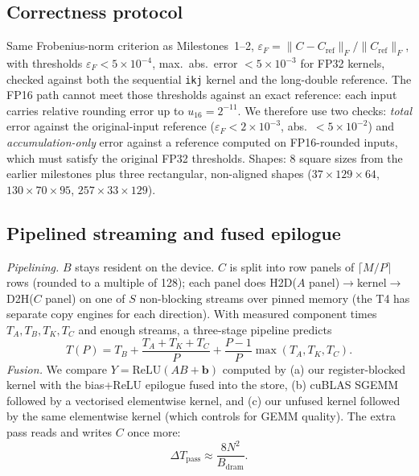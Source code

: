 \documentclass[conference]{IEEEtran}
\begin{document}
\subsection{Correctness protocol}
Same Frobenius-norm criterion as Milestones~1--2, $\varepsilon_F=\|C-C_{\mathrm{ref}}\|_F/\|C_{\mathrm{ref}}\|_F$, with thresholds $\varepsilon_F<5{\times}10^{-4}$, max.\ abs.\ error $<5{\times}10^{-3}$ for FP32 kernels, checked against both the sequential \texttt{ikj} kernel and the long-double reference. The FP16 path cannot meet those thresholds against an exact reference: each input carries relative rounding error up to $u_{16}=2^{-11}$. We therefore use two checks: \emph{total} error against the original-input reference ($\varepsilon_F<2{\times}10^{-3}$, abs.\ $<5{\times}10^{-2}$) and \emph{accumulation-only} error against a reference computed on FP16-rounded inputs, which must satisfy the original FP32 thresholds. Shapes: 8 square sizes from the earlier milestones plus three rectangular, non-aligned shapes ($37{\times}129{\times}64$, $130{\times}70{\times}95$, $257{\times}33{\times}129$).

\subsection{Pipelined streaming and fused epilogue}
\emph{Pipelining.} $B$ stays resident on the device. $C$ is split into row panels of $\lceil M/P\rceil$ rows (rounded to a multiple of 128); each panel does H2D($A$ panel)$\to$kernel$\to$D2H($C$ panel) on one of $S$ non-blocking streams over pinned memory (the T4 has separate copy engines for each direction). With measured component times $T_A,T_B,T_K,T_C$ and enough streams, a three-stage pipeline predicts
\begin{equation}
T(P) = T_B + \frac{T_A{+}T_K{+}T_C}{P} + \frac{P{-}1}{P}\max(T_A,T_K,T_C).\label{eq:pipe}
\end{equation}
\emph{Fusion.} We compare $Y=\mathrm{ReLU}(AB+\mathbf{b})$ computed by (a) our register-blocked kernel with the bias+ReLU epilogue fused into the store, (b) cuBLAS SGEMM followed by a vectorised elementwise kernel, and (c) our unfused kernel followed by the same elementwise kernel (which controls for GEMM quality). The extra pass reads and writes $C$ once more:
\begin{equation}
\Delta T_{\mathrm{pass}} \approx \frac{8N^2}{B_{\mathrm{dram}}}.\label{eq:pass}
\end{equation}
\end{document}
